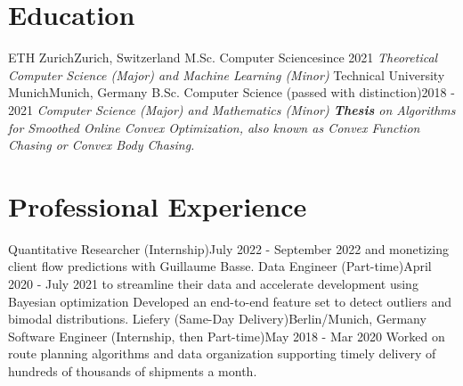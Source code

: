 \documentclass[a4paper,20pt]{article}
\begin{document}


\vspace{-5pt}
\section{Education}
  \resumeSubHeadingListStart
    \resumeSubheading
      {ETH Zurich}{Zurich, Switzerland}
      {M.Sc. Computer Science}{since 2021}
      {\scriptsize \textit{ \footnotesize{\newline{}Theoretical Computer Science (Major) and Machine Learning (Minor)}}}
    \resumeSubHeadingListEnd
\vspace{-5pt}
  \resumeSubHeadingListStart
    \resumeSubheading
      {Technical University Munich}{Munich, Germany}
      {B.Sc. Computer Science (passed with distinction)}{2018 - 2021}
      {\scriptsize \textit{ \footnotesize{\newline{}Computer Science (Major) and Mathematics (Minor)}
      \footnotesize{\newline{}\textbf{Thesis} on Algorithms for Smoothed Online Convex Optimization, also known as Convex Function Chasing or Convex Body Chasing.}}}
    \resumeSubHeadingListEnd

\vspace{-5pt}
\section{Professional Experience}
  \resumeSubHeadingListStart
    {Quantitative Researcher (Internship)}{July 2022 - September 2022}
    \resumeItemListStart
          {and monetizing client flow predictions with Guillaume Basse.}
      \resumeItemListEnd
    {Data Engineer (Part-time)}{April 2020 - July 2021}
    \resumeItemListStart
          {to streamline their data and accelerate development using Bayesian optimization}
          {Developed an end-to-end feature set to detect outliers and bimodal distributions.}
      \resumeItemListEnd
    \resumeSubheading
		{Liefery (Same-Day Delivery)}{Berlin/Munich, Germany}
		{Software Engineer (Internship, then Part-time)}{May 2018 - Mar 2020}
		\resumeItemListStart
          {Worked on route planning algorithms and data organization supporting timely delivery of hundreds of thousands of shipments a month.}
		\resumeItemListEnd
\resumeSubHeadingListEnd
\end{document}
